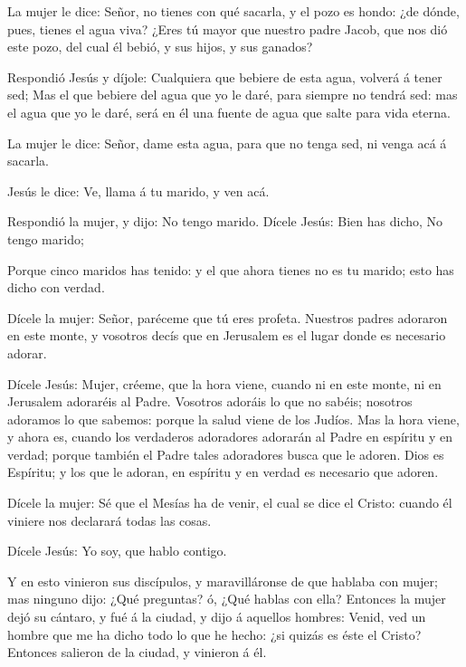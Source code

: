  La mujer le dice: Señor, no tienes con qué sacarla, y el
pozo es hondo: ¿de dónde, pues, tienes el agua viva?  ¿Eres
tú mayor que nuestro padre Jacob, que nos dió este pozo, del cual él
bebió, y sus hijos, y sus ganados?

 Respondió Jesús y díjole: Cualquiera que bebiere de esta
agua, volverá á tener sed;  Mas el que bebiere del agua que
yo le daré, para siempre no tendrá sed: mas el agua que yo le daré, será
en él una fuente de agua que salte para vida eterna.

 La mujer le dice: Señor, dame esta agua, para que no tenga
sed, ni venga acá á sacarla.

 Jesús le dice: Ve, llama á tu marido, y ven acá.

 Respondió la mujer, y dijo: No tengo marido. Dícele Jesús:
Bien has dicho, No tengo marido;

 Porque cinco maridos has tenido: y el que ahora tienes no
es tu marido; esto has dicho con verdad.

 Dícele la mujer: Señor, paréceme que tú eres profeta.
 Nuestros padres adoraron en este monte, y vosotros decís
que en Jerusalem es el lugar donde es necesario adorar.

 Dícele Jesús: Mujer, créeme, que la hora viene, cuando ni
en este monte, ni en Jerusalem adoraréis al Padre. 
Vosotros adoráis lo que no sabéis; nosotros adoramos lo que sabemos:
porque la salud viene de los Judíos.  Mas la hora viene, y
ahora es, cuando los verdaderos adoradores adorarán al Padre en espíritu
y en verdad; porque también el Padre tales adoradores busca que le
adoren.  Dios es Espíritu; y los que le adoran, en espíritu
y en verdad es necesario que adoren.

 Dícele la mujer: Sé que el Mesías ha de venir, el cual se
dice el Cristo: cuando él viniere nos declarará todas las cosas.

 Dícele Jesús: Yo soy, que hablo contigo.

 Y en esto vinieron sus discípulos, y maravilláronse de que
hablaba con mujer; mas ninguno dijo: ¿Qué preguntas? ó, ¿Qué hablas con
ella?  Entonces la mujer dejó su cántaro, y fué á la
ciudad, y dijo á aquellos hombres:  Venid, ved un hombre
que me ha dicho todo lo que he hecho: ¿si quizás es éste el Cristo?
 Entonces salieron de la ciudad, y vinieron á él.

